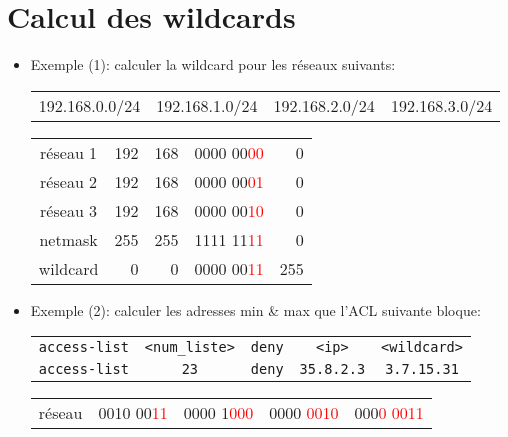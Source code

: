 \documentclass[a4paper]{article}
\begin{document}
\section{Calcul des wildcards}



\begin{itemize}
    \item Exemple (1): calculer la wildcard pour les réseaux suivants:
    \begin{center}
        \begin{tabular}{c|c|c|c}
            192.168.0.0/24 & 192.168.1.0/24 & 192.168.2.0/24 & 192.168.3.0/24
        \end{tabular}
    \end{center}
    \begin{example}
        \begin{center}
            \begin{tabular}{crrrr}
                réseau 1 & 192 & 168 & 0000 00\textcolor{red}{00} & 0 \\
                réseau 2 & 192 & 168 & 0000 00\textcolor{red}{01} & 0 \\
                réseau 3 & 192 & 168 & 0000 00\textcolor{red}{10} & 0 \\
                netmask  & 255 & 255 & 1111 11\textcolor{red}{11} & 0 \\
                wildcard & 0   & 0   & 0000 00\textcolor{red}{11} & 255 \\
            \end{tabular}
        \end{center}
    \end{example}
    \item Exemple (2): calculer les adresses min \& max que l'ACL suivante bloque:
    \begin{center}
        \begin{tabular}{ccccc}
            \texttt{access-list} & \texttt{<num\_liste>} & \texttt{deny} & \texttt{<ip>} & \texttt{<wildcard>} \\
            \texttt{access-list} & \texttt{23} & \texttt{deny} & \texttt{35.8.2.3} & \texttt{3.7.15.31} \\
        \end{tabular}
    \end{center}
    \begin{example}
        \begin{center}
            \begin{tabular}{crrrr}
                réseau   & 0010 00\textcolor{red}{11} & 0000 1\textcolor{red}{000} & 0000 \textcolor{red}{0010} & 000\textcolor{red}{0 0011} \\

\end{tabular}
\end{center}
\end{example}
\end{itemize}
\end{document}

